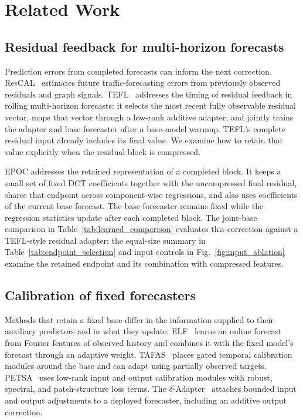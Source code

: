 \section{Related Work}
\label{sec:related_work}

\subsection{Residual feedback for multi-horizon forecasts}
Prediction errors from completed forecasts can inform the next correction. ResCAL~\cite{rescal2022} estimates future traffic-forecasting errors from previously observed residuals and graph signals. TEFL~\cite{tefl2026} addresses the timing of residual feedback in rolling multi-horizon forecasts: it selects the most recent fully observable residual vector, maps that vector through a low-rank additive adapter, and jointly trains the adapter and base forecaster after a base-model warmup. TEFL's complete residual input already includes its final value. We examine how to retain that value explicitly when the residual block is compressed.

EPOC addresses the retained representation of a completed block. It keeps a small set of fixed DCT coefficients together with the uncompressed final residual, shares that endpoint across component-wise regressions, and also uses coefficients of the current base forecast. The base forecaster remains fixed while the regression statistics update after each completed block. The joint-base comparison in Table~\ref{tab:learned_comparison} evaluates this correction against a TEFL-style residual adapter; the equal-size summary in Table~\ref{tab:endpoint_selection} and input controls in Fig.~\ref{fig:input_ablation} examine the retained endpoint and its combination with compressed features.

\subsection{Calibration of fixed forecasters}
Methods that retain a fixed base differ in the information supplied to their auxiliary predictors and in what they update. ELF~\cite{elf2025} learns an online forecast from Fourier features of observed history and combines it with the fixed model's forecast through an adaptive weight. TAFAS~\cite{tafas2025} places gated temporal calibration modules around the base and can adapt using partially observed targets. PETSA~\cite{petsa2025} uses low-rank input and output calibration modules with robust, spectral, and patch-structure loss terms. The $\delta$-Adapter~\cite{deltaadapter2026} attaches bounded input and output adjustments to a deployed forecaster, including an additive output correction.

